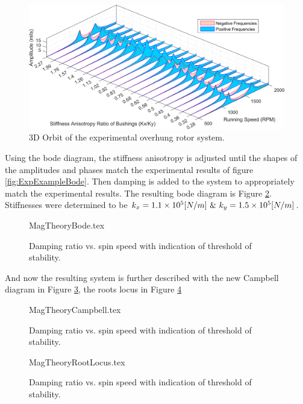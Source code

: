\begin{figure}
	\centering
	\includegraphics[width=\linewidth]{./figures/Images/Figure_5.png}
	\caption{3D Orbit of the experimental overhung rotor system.}
	\label{fig:PosNegStiffAniCompare}
\end{figure}
Using the bode diagram, the stiffness anisotropy is adjusted until the shapes of the amplitudes and phases match the experimental results of figure \ref{fig:ExpExampleBode}. Then damping is added to the system to appropriately match the experimental results. The resulting bode diagram is Figure \ref{fig:MagTheoryBode}. Stiffnesses were determined to be $ k_x=1.1\e{5}[N/m]\ \&\ k_y=1.5\e{5}[N/m] $.
\begin{figure}[!htb]
	\def\width{.6\linewidth}
	\def\height{.4\linewidth}
	\def\sep{3em}
	\centering
	{MagTheoryBode.tex}
	\caption{Damping ratio vs. spin speed with indication of threshold of stability.}
	\label{fig:MagTheoryBode}
\end{figure}
And now the resulting system is further described with the new Campbell diagram in Figure \ref{fig:MagTheoryCampbell}, the roots locus in Figure \ref{fig:MagTheoryRootLocus}
\begin{figure}[!htb]
	\def\width{.6\linewidth}
	\def\height{.4\linewidth}
	\def\sep{3em}
	\centering
	{MagTheoryCampbell.tex}
	\caption{Damping ratio vs. spin speed with indication of threshold of stability.}
	\label{fig:MagTheoryCampbell}
\end{figure}
\begin{figure}[!htb]
	\def\width{.6\linewidth}
	\def\height{.4\linewidth}
	\def\sep{3em}
	\centering
	{MagTheoryRootLocus.tex}
	\caption{Damping ratio vs. spin speed with indication of threshold of stability.}
	\label{fig:MagTheoryRootLocus}
\end{figure}
